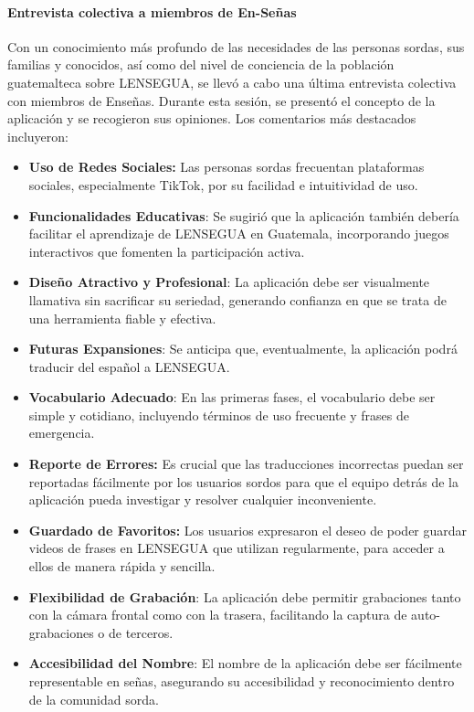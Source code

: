 \paragraph{Entrevista colectiva a miembros de En-Señas}

Con un conocimiento más profundo de las necesidades de las personas sordas, sus familias y conocidos, así como del nivel de conciencia de la población guatemalteca sobre LENSEGUA, se llevó a cabo una última entrevista colectiva con miembros de Enseñas. Durante esta sesión, se presentó el concepto de la aplicación y se recogieron sus opiniones. Los comentarios más destacados incluyeron:

\begin{itemize}
    \item \textbf{Uso de Redes Sociales:} Las personas sordas frecuentan plataformas sociales, especialmente TikTok, por su facilidad e intuitividad de uso.
    
    \item \textbf{Funcionalidades Educativas}: Se sugirió que la aplicación también debería facilitar el aprendizaje de LENSEGUA en Guatemala, incorporando juegos interactivos que fomenten la participación activa.
    
    \item \textbf{Diseño Atractivo y Profesional}: La aplicación debe ser visualmente llamativa sin sacrificar su seriedad, generando confianza en que se trata de una herramienta fiable y efectiva.
    
    \item \textbf{Futuras Expansiones}: Se anticipa que, eventualmente, la aplicación podrá traducir del español a LENSEGUA.
    
    \item \textbf{Vocabulario Adecuado}: En las primeras fases, el vocabulario debe ser simple y cotidiano, incluyendo términos de uso frecuente y frases de emergencia.
    
    \item \textbf{Reporte de Errores:} Es crucial que las traducciones incorrectas puedan ser reportadas fácilmente por los usuarios sordos para que el equipo detrás de la aplicación pueda investigar y resolver cualquier inconveniente.
    
    \item \textbf{Guardado de Favoritos:} Los usuarios expresaron el deseo de poder guardar videos de frases en LENSEGUA que utilizan regularmente, para acceder a ellos de manera rápida y sencilla.
    
    \item \textbf{Flexibilidad de Grabación}: La aplicación debe permitir grabaciones tanto con la cámara frontal como con la trasera, facilitando la captura de auto-grabaciones o de terceros.
    
    \item \textbf{Accesibilidad del Nombre}: El nombre de la aplicación debe ser fácilmente representable en señas, asegurando su accesibilidad y reconocimiento dentro de la comunidad sorda.
    
\end{itemize}

